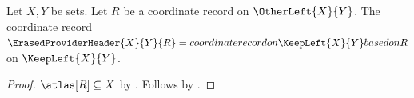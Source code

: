

\begin{construction}\label{erased_provider_header}
    Let $X,Y$ be sets.
    Let $R$ be a coordinate record on $\OtherLeft{X}{Y}$.
    The coordinate record $\ErasedProviderHeader{X}{Y}{R}=
        coordinate record on \KeepLeft{X}{Y} based on R$
        on $\KeepLeft{X}{Y}$.
\end{construction}
\begin{proof}
    $\atlas[R]\subseteq X$ by .
    Follows by .
\end{proof}
